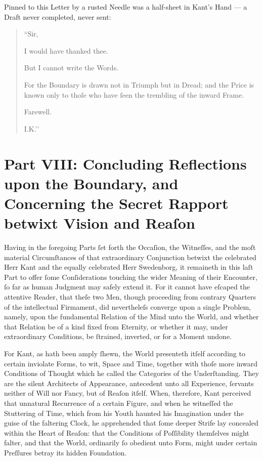 \documentclass[12pt]{book}
\begin{document}
\medskip

Pinned to this Letter by a rusted Needle was a half-sheet in Kant’s Hand — a Draft never completed, never sent:

\medskip

\begin{quote}
``Sir,

I would have thanked thee.

But I cannot write the Words.

For the Boundary is drawn not in Triumph but in Dread; and the Price is known only to thoſe who have ſeen the trembling of the inward Frame.

Farewell.

I.K.’’
\end{quote}

\medskip

\newpage
\section*{Part VIII: Concluding Reflections upon the Boundary, and Concerning the Secret Rapport betwixt Vision and Reaſon}


\noindent
Having in the foregoing Parts ſet forth the Occaſion, the Witneſſes, and the moſt material Circumſtances of that extraordinary Conjunction betwixt the celebrated Herr Kant and the equally celebrated Herr Swedenborg, it remaineth in this laſt Part to offer ſome Conſiderations touching the wider Meaning of their Encounter, ſo far as human Judgment may safely extend it. For it cannot have eſcaped the attentive Reader, that theſe two Men, though proceeding from contrary Quarters of the intellectual Firmament, did nevertheleſs converge upon a single Problem, namely, upon the fundamental Relation of the Mind unto the World, and whether that Relation be of a kind fixed from Eternity, or whether it may, under extraordinary Conditions, be ſtrained, inverted, or for a Moment undone.

\vspace{1em}

\noindent
For Kant, as hath been amply ſhewn, the World presenteth itſelf according to certain inviolate Forms, to wit, Space and Time, together with thoſe more inward Conditions of Thought which he called the Categories of the Underſtanding. They are the silent Architects of Appearance, antecedent unto all Experience, ſervants neither of Will nor Fancy, but of Reaſon itſelf. When, therefore, Kant perceived that unnatural Recurrence of a certain Figure, and when he witneſſed the Stuttering of Time, which from his Youth haunted his Imagination under the guise of the faltering Clock, he apprehended that ſome deeper Strife lay concealed within the Heart of Reaſon: that the Conditions of Poſſibility themſelves might falter, and that the World, ordinarily ſo obedient unto Form, might under certain Preſſures betray its hidden Foundation.
\end{document}
